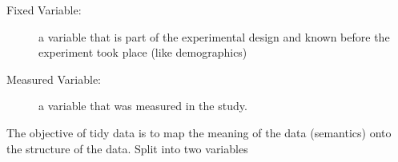 
\begin{description}
\item[Fixed Variable:] a variable that is part of the experimental design and known before the experiment took place (like demographics)
\item[Measured Variable:] a variable that was measured in the study.
\end{description}
The objective of tidy data is to map the meaning of the data (semantics) onto the structure of the data.
Split into two variables
